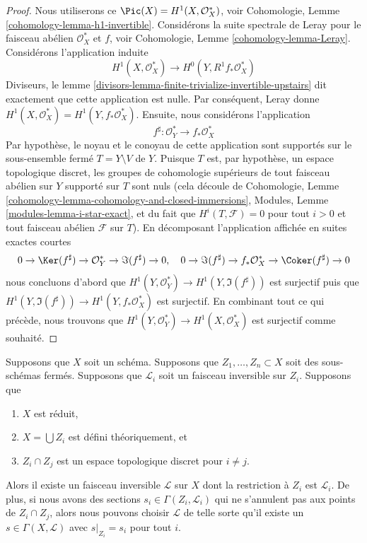 \begin{proof}
Nous utiliserons ce $\Pic(X) = H^1(X, \mathcal{O}_X^*)$,
voir Cohomologie, Lemme
\ref{cohomology-lemma-h1-invertible}. Considérons la suite spectrale de
Leray pour le faisceau abélien $\mathcal{O}_X^*$ et $f$, voir
Cohomologie, Lemme \ref{cohomology-lemma-Leray}. Considérons l'application induite
$$
H^1(X, \mathcal{O}_X^*) \longrightarrow H^0(Y, R^1f_*\mathcal{O}_X^*)
$$
Diviseurs, le lemme
\ref{divisors-lemma-finite-trivialize-invertible-upstairs} dit exactement que
cette application est nulle. Par conséquent, Leray donne $H^1(X,
\mathcal{O}_X^*) = H^1(Y, f_*\mathcal{O}_X^*)$. Ensuite, nous considérons l'application
$$
f^\sharp : \mathcal{O}_Y^* \longrightarrow f_*\mathcal{O}_X^*
$$
Par hypothèse, le noyau et le conoyau de cette application
sont supportés sur le sous-ensemble fermé $T = Y \setminus
V$ de $Y$. Puisque $T$ est, par hypothèse, un espace
topologique discret, les groupes de cohomologie supérieurs de
tout faisceau abélien sur $Y$ supporté sur $T$ sont nuls
(cela découle de Cohomologie, Lemme
\ref{cohomology-lemma-cohomology-and-closed-immersions}, Modules,
Lemme \ref{modules-lemma-i-star-exact}, et du fait que $H^i(T,
\mathcal{F}) = 0$ pour tout $i > 0$ et tout faisceau abélien $\mathcal{F}$
sur $T$). En décomposant l'application affichée en suites exactes courtes
$$
0 \to \Ker(f^\sharp) \to \mathcal{O}_Y^* \to \Im(f^\sharp) \to 0,\quad
0 \to \Im(f^\sharp) \to f_*\mathcal{O}_X^* \to \Coker(f^\sharp) \to 0
$$
nous concluons d'abord que $H^1(Y, \mathcal{O}_Y^*) \to
H^1(Y, \Im(f^\sharp))$ est surjectif puis que $H^1(Y,
\Im(f^\sharp)) \to H^1(Y, f_*\mathcal{O}_X^*)$ est surjectif. En
combinant tout ce qui précède, nous trouvons que $H^1(Y,
\mathcal{O}_Y^*) \to H^1(X, \mathcal{O}_X^*)$ est surjectif comme souhaité.
\end{proof}

\begin{lemma}
\label{lemma-glue-invertible-sheaves}
Supposons que $X$ soit un schéma. Supposons que $Z_1, \ldots,
Z_n \subset X$ soit des sous-schémas fermés. Supposons que
$\mathcal{L}_i$ soit un faisceau inversible sur $Z_i$. Supposons que
\begin{enumerate}
\item $X$ est réduit, \item $X = \bigcup Z_i$ est
défini théoriquement, et \item $Z_i \cap Z_j$ est
un espace topologique discret pour $i \not = j$.
\end{enumerate}
Alors il existe un faisceau inversible $\mathcal{L}$ sur $X$
dont la restriction à $Z_i$ est $\mathcal{L}_i$. De plus, si
nous avons des sections $s_i \in \Gamma(Z_i, \mathcal{L}_i)$
qui ne s'annulent pas aux points de $Z_i \cap Z_j$, alors nous
pouvons choisir $\mathcal{L}$ de telle sorte qu'il existe un $s
\in \Gamma(X, \mathcal{L})$ avec $s|_{Z_i} = s_i$ pour tout $i$.
\end{lemma}

